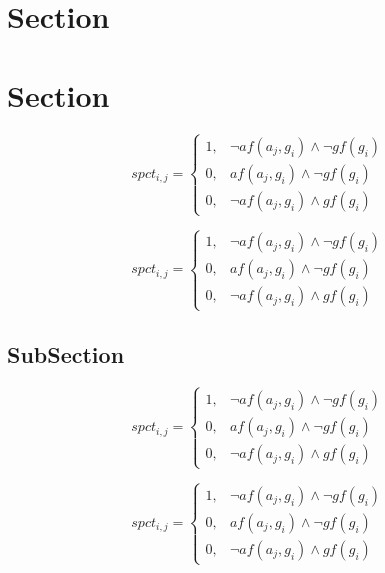 \documentclass[a4paper]{article}
\begin{document}
\section{Section}

\section{Section}

\begin{equation}
spct_{i,j} =
\begin{cases}
1, & \text{$\neg af(a_j,g_i) \wedge \neg gf(g_i)$}\\
0, & \text{$af(a_j,g_i) \wedge \neg gf(g_i)$}\\
0, & \text{$\neg af(a_j,g_i) \wedge gf(g_i)$}
\end{cases}
\end{equation}

\begin{equation}
spct_{i,j} =
\begin{cases}
1, & \text{$\neg af(a_j,g_i) \wedge \neg gf(g_i)$}\\
0, & \text{$af(a_j,g_i) \wedge \neg gf(g_i)$}\\
0, & \text{$\neg af(a_j,g_i) \wedge gf(g_i)$}
\end{cases}
\end{equation}

\subsection{SubSection}

\begin{equation}
spct_{i,j} =
\begin{cases}
1, & \text{$\neg af(a_j,g_i) \wedge \neg gf(g_i)$}\\
0, & \text{$af(a_j,g_i) \wedge \neg gf(g_i)$}\\
0, & \text{$\neg af(a_j,g_i) \wedge gf(g_i)$}
\end{cases}
\end{equation}

\begin{equation}
spct_{i,j} =
\begin{cases}
1, & \text{$\neg af(a_j,g_i) \wedge \neg gf(g_i)$}\\
0, & \text{$af(a_j,g_i) \wedge \neg gf(g_i)$}\\
0, & \text{$\neg af(a_j,g_i) \wedge gf(g_i)$}
\end{cases}
\end{equation}
\end{document}
